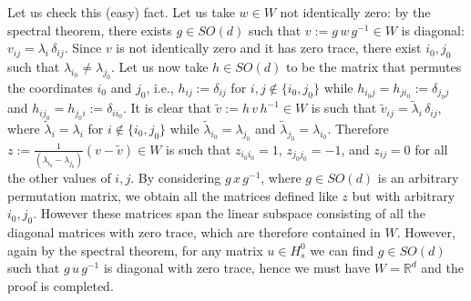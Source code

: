 \documentclass[a4paper,reqno,11pt]{amsart}
\numberwithin{equation}{section}
\newcommand{\gd}{\delta}
\newcommand{\gl}{\lambda}
\renewcommand{\tilde}{\widetilde}          %
\newcommand{\R}{\mathbb{R}}
\def\bE{\ensuremath{\bs{\mathrm{E}}}}
\def\bs{\boldsymbol}
\begin{document}
Let us check this (easy) fact. Let us take $w \in W$ not
identically zero: by the spectral theorem, there exists $g \in SO(d)$ such
that $v := g \, w \, g^{-1} \in W$ is diagonal: $v_{ij} = \gl_i \, \gd_{ij}$.
Since $v$ is not identically zero and it has zero trace, there exist
$i_0, j_0$ such that $\gl_{i_0} \ne \gl_{j_0}$. Let us now take $h \in SO(d)$
to be the matrix that permutes the coordinates $i_0$ and $j_0$, i.e.,
$h_{ij} := \gd_{ij}$ for $i,j \not \in \{i_0, j_0\}$
while $h_{i_0 j} = h_{j i_0} := \gd_{j_0 j}$
and $h_{i j_0} = h_{j_0 i} := \gd_{i i_0}$. It is clear that
$\tilde v := h \, v \, h^{-1} \in W$
is such that $\tilde v_{ij} = \tilde \gl_i\, \gd_{ij}$,
where $\tilde \gl_i = \gl_i$ for
$i \not \in \{i_0, j_0\}$ while $\tilde \gl_{i_0} = \gl_{j_0}$
and $\tilde \gl_{j_0} = \gl_{i_0}$. Therefore
$z :=\frac{1}{(\gl_{i_0} - \gl_{j_0})} (v - \tilde v) \in W$ is such that
$z_{i_0 i_0}=1$, $z_{j_0 j_0}=-1$, and $z_{ij}=0$ for all the other values of $i,j$.
By considering $g \, x \, g^{-1}$, where $g \in SO(d)$ is an
arbitrary permutation matrix,
we obtain all the matrices defined like $z$ but with arbitrary $i_0, j_0$.
However these matrices span the linear subspace consisting of all the diagonal matrices
with zero trace, which are therefore contained in $W$. However, again by the spectral
theorem, for any matrix $u \in H^0_s$ we can find $g \in SO(d)$ such that
$g \, u \, g^{-1}$ is diagonal with zero trace, hence we must have $W = \R^d$
and the proof is completed.


\end{document}

